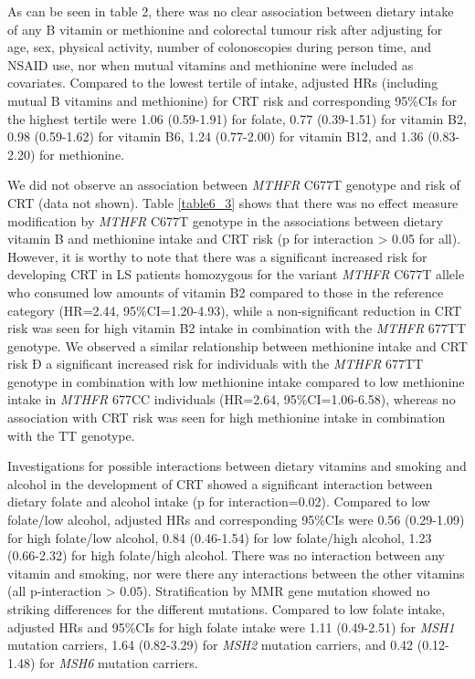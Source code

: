 \noindent As can be seen in table 2, there was no clear association between dietary intake of any B vitamin or methionine and colorectal tumour risk after adjusting for age, sex, physical activity, number of colonoscopies during person time, and NSAID use, nor when mutual vitamins and methionine were included as covariates. Compared to the lowest tertile of intake, adjusted HRs (including mutual B vitamins and methionine) for CRT risk and corresponding 95\%CIs for the highest tertile were 1.06 (0.59-1.91) for folate, 0.77 (0.39-1.51) for vitamin B2, 0.98 (0.59-1.62) for vitamin B6, 1.24 (0.77-2.00) for vitamin B12, and 1.36 (0.83-2.20) for methionine.

\noindent We did not observe an association between \emph{MTHFR} C677T genotype and risk of CRT (data not shown). Table \ref{table6_3} shows that there was no effect measure modification by \emph{MTHFR} C677T genotype in the associations between dietary vitamin B and methionine intake and CRT risk (p for interaction > 0.05 for all). However, it is worthy to note that there was a significant increased risk for developing CRT in LS patients homozygous for the variant \emph{MTHFR} C677T allele who consumed low amounts of vitamin B2 compared to those in the reference category (HR=2.44, 95\%CI=1.20-4.93), while a non-significant reduction in CRT risk was seen for high vitamin B2 intake in combination with the \emph{MTHFR} 677TT genotype. We observed a similar relationship between methionine intake and CRT risk Ð a significant increased risk for individuals with the \emph{MTHFR} 677TT genotype in combination with low methionine intake compared to low methionine intake in \emph{MTHFR} 677CC individuals (HR=2.64, 95\%CI=1.06-6.58), whereas no association with CRT risk was seen for high methionine intake in combination with the TT genotype.

\noindent Investigations for possible interactions between dietary vitamins and smoking and alcohol in the development of CRT showed a significant interaction between dietary folate and alcohol intake (p for interaction=0.02). Compared to low folate/low alcohol, adjusted HRs and corresponding 95\%CIs were 0.56 (0.29-1.09) for high folate/low alcohol, 0.84 (0.46-1.54) for low folate/high alcohol, 1.23 (0.66-2.32) for high folate/high alcohol. There was no interaction between any vitamin and smoking, nor were there any interactions between the other vitamins (all p-interaction > 0.05). Stratification by MMR gene mutation showed no striking differences for the different mutations. Compared to low folate intake, adjusted HRs and 95\%CIs for high folate intake were 1.11 (0.49-2.51) for \emph{MSH1} mutation carriers, 1.64 (0.82-3.29) for \emph{MSH2} mutation carriers, and 0.42 (0.12-1.48) for \emph{MSH6} mutation carriers.

